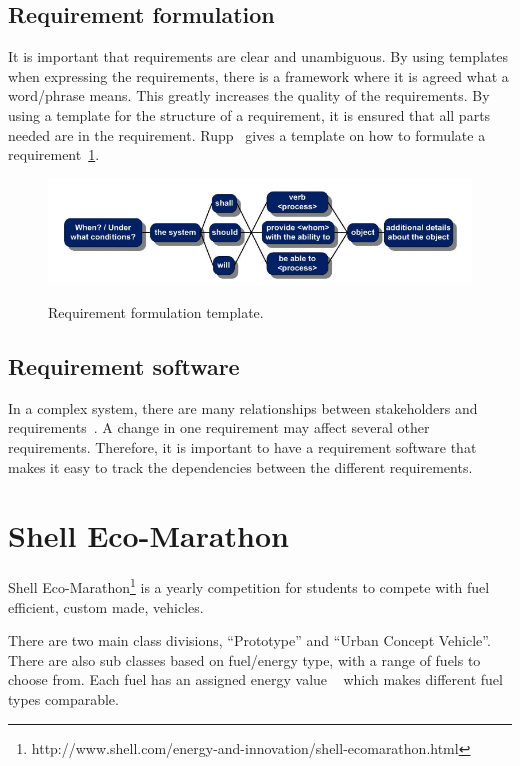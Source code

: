 \subsection{Requirement formulation}
It is important that requirements are clear and unambiguous. By using templates
when expressing the requirements, there is a framework where it is agreed what a
word/phrase means. This greatly increases the quality of the requirements\cite{rupp2014}. 
By using a template for the structure of a requirement, it is
ensured that all parts needed are in the requirement. Rupp~\cite{rupp2014}
gives a template on how to formulate a requirement~\ref{fig:req_template}.
\begin{figure}[H]
    \centering
    \includegraphics[width=\textwidth]{./img/introduction_req_template.PNG}\label{fig:req_template}
    \caption{Requirement formulation template.}
\end{figure}
\subsection{Requirement software}
In a complex system, there are many relationships between stakeholders and
requirements~\cite{ibm_req}. A change in one requirement may affect several other
requirements. Therefore, it is important to have a requirement software that
makes it easy to track the dependencies between the different requirements.

\section{Shell Eco-Marathon}
Shell Eco-Marathon\footnote{http://www.shell.com/energy-and-innovation/shell-ecomarathon.html} is a yearly competition for students to compete with fuel efficient, custom made, vehicles.

There are two main class divisions, ``Prototype'' and ``Urban Concept
Vehicle''. There are also sub classes based on fuel/energy type, with a range
of fuels to choose from. Each fuel has an assigned energy value ~\cite{semrules16c1} which makes different fuel types comparable. 

